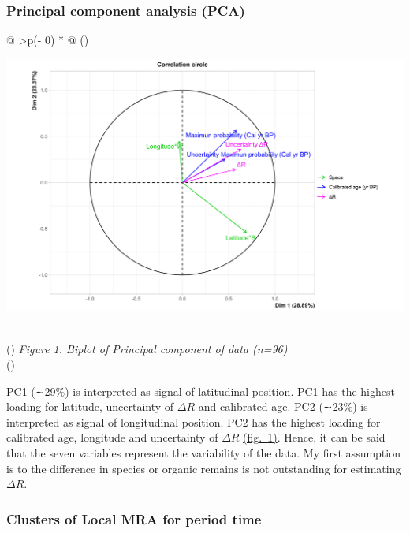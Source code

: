 \documentclass[
]{article}
\begin{document}
\hypertarget{principal-component-analysis-pca}{%
\subsubsection{Principal component analysis
(PCA)}\label{principal-component-analysis-pca}}

\begin{longtable}[]{@{}
  >{\centering\arraybackslash}p{(\columnwidth - 0\tabcolsep) * }@{}}
\toprule()
\begin{minipage}[b]{\linewidth}\centering
\href{https://github.com/jasb3110/Radiocarbon-reservoir/blob/db842ff0620d55ea5ca5ceec0d96a369406b6e3c/AMV.biplot.png?raw=true}{\includegraphics{AMV.biplot.png}}
\end{minipage} \\
\midrule()
\endhead
\emph{Figure 1. Biplot of Principal component of data (n=96)} \\
\bottomrule()
\end{longtable}

PC1 (∼29\%) is interpreted as signal of latitudinal position. PC1 has
the highest loading for latitude, uncertainty of \(\Delta R\) and
calibrated age. PC2 (∼23\%) is interpreted as signal of longitudinal
position. PC2 has the highest loading for calibrated age, longitude and
uncertainty of \(\Delta R\)
\protect\hyperlink{principal-component-analysis-ux28pcaux29}{(fig.~1)}.
Hence, it can be said that the seven variables represent the variability
of the data. My first assumption is to the difference in species or
organic remains is not outstanding for estimating \(\Delta R\).

\hypertarget{clusters-of-local-mra-for-period-time}{%
\subsubsection{Clusters of Local MRA for period
time}\label{clusters-of-local-mra-for-period-time}}
\end{document}
